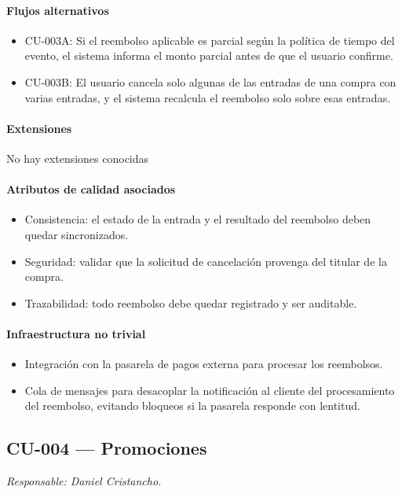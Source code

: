 \paragraph{Flujos alternativos}
\begin{itemize}[leftmargin=1.4em, topsep=1pt]
  \item CU-003A: Si el reembolso aplicable es parcial según la política de tiempo del evento, el sistema informa el monto parcial antes de que el usuario confirme.
  \item CU-003B: El usuario cancela solo algunas de las entradas de una compra con varias entradas, y el sistema recalcula el reembolso solo sobre esas entradas.
\end{itemize}

\paragraph{Extensiones}
No hay extensiones conocidas

\paragraph{Atributos de calidad asociados}
\begin{itemize}[leftmargin=1.4em, topsep=1pt]
  \item Consistencia: el estado de la entrada y el resultado del reembolso deben quedar sincronizados.
  \item Seguridad: validar que la solicitud de cancelación provenga del titular de la compra.
  \item Trazabilidad: todo reembolso debe quedar registrado y ser auditable.
\end{itemize}

\paragraph{Infraestructura no trivial}
\begin{itemize}[leftmargin=1.4em, topsep=1pt]
  \item Integración con la pasarela de pagos externa para procesar los reembolsos.
  \item Cola de mensajes para desacoplar la notificación al cliente del procesamiento del reembolso, evitando bloqueos si la pasarela responde con lentitud.
\end{itemize}

\subsection{CU-004 --- Promociones}
\label{cu:cu-004}
\textit{Responsable: Daniel Cristancho.}

